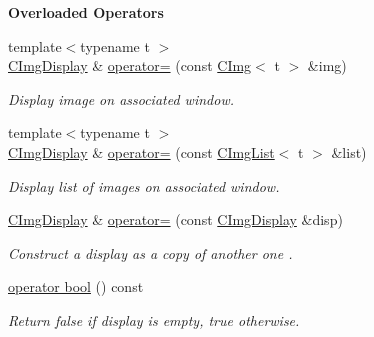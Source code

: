 \begin{Indent}\textbf{ Overloaded Operators}\par
\begin{DoxyCompactItemize}
\item 
{\footnotesize template$<$typename t $>$ }\\\hyperlink{structcimg__library__suffixed_1_1CImgDisplay}{C\+Img\+Display} \& \hyperlink{structcimg__library__suffixed_1_1CImgDisplay_ac5f0339274799f6b5b34c7705d406b2c}{operator=} (const \hyperlink{structcimg__library__suffixed_1_1CImg}{C\+Img}$<$ t $>$ \&img)
\begin{DoxyCompactList}\small\item\em Display image on associated window. \end{DoxyCompactList}\item 
{\footnotesize template$<$typename t $>$ }\\\hyperlink{structcimg__library__suffixed_1_1CImgDisplay}{C\+Img\+Display} \& \hyperlink{structcimg__library__suffixed_1_1CImgDisplay_ab901ebd7011b508431b03635faeea838}{operator=} (const \hyperlink{structcimg__library__suffixed_1_1CImgList}{C\+Img\+List}$<$ t $>$ \&list)
\begin{DoxyCompactList}\small\item\em Display list of images on associated window. \end{DoxyCompactList}\item 
\hyperlink{structcimg__library__suffixed_1_1CImgDisplay}{C\+Img\+Display} \& \hyperlink{structcimg__library__suffixed_1_1CImgDisplay_a388d50e8afcbc70eb32cd23c0c556416}{operator=} (const \hyperlink{structcimg__library__suffixed_1_1CImgDisplay}{C\+Img\+Display} \&disp)
\begin{DoxyCompactList}\small\item\em Construct a display as a copy of another one . \end{DoxyCompactList}\item 
\hyperlink{structcimg__library__suffixed_1_1CImgDisplay_a61454bcb46ac5620760e9488b5819ecd}{operator bool} () const
\begin{DoxyCompactList}\small\item\em Return {\ttfamily false} if display is empty, {\ttfamily true} otherwise. \end{DoxyCompactList}\end{DoxyCompactItemize}
\end{Indent}
